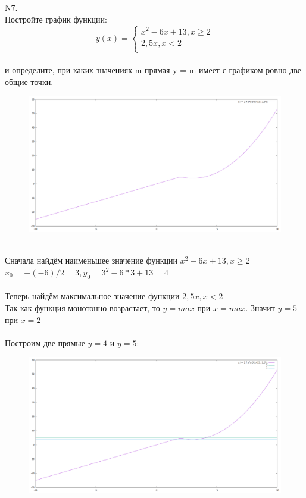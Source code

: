 \documentclass{article}
\begin{document}
	N7.\\
	Постройте график функции:\\
	\begin{equation*}
		y(x) = 
		\begin{cases}
			x^2-6x+13, x \geq 2\\
			2,5x, x < 2\\
		\end{cases}
	\end{equation*}\\
	и определите, при каких значениях m прямая y = m имеет с графиком ровно две общие точки.\\
	\begin{figure}[h!]
		\begin{center}
			\includegraphics[scale=0.2]{N7 graphic 1}
		\end{center}
	\end{figure}\\
	Сначала найдём наименьшее значение функции $x^2-6x+13, x \geq 2$\\
	$x_{0} = -(-6)/2=3, y_{0} = 3^2-6*3+13=4$\\
	\\
	Теперь найдём максимальное значение функции $2,5x, x < 2$\\
	Так как функция монотонно возрастает, то $y=max$ при $x=max$. Значит $y=5$ при $x=2$\\
	\\
	Построим две прямые $y=4$ и $y=5$:\\
	\begin{figure}[h!]
		\begin{center}
			\includegraphics[scale=0.2]{N7 graphic 2}
		\end{center}
	\end{figure}\\
\end{document}
